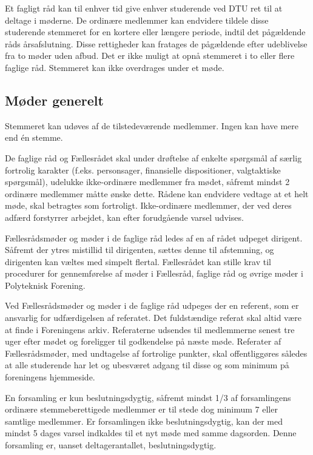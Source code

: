 \begin{list}
\begin{list}
\item  Et fagligt råd kan til enhver tid give enhver studerende ved DTU ret til at deltage i møderne. De ordinære medlemmer kan endvidere tildele disse studerende stemmeret for en kortere eller længere periode, indtil det pågældende råds årsafslutning. Disse rettigheder kan fratages de pågældende efter udeblivelse fra to møder uden afbud. Det er ikke muligt at opnå stemmeret i to eller flere faglige råd. Stemmeret kan ikke overdrages under et møde.


\subsection{Møder generelt}
\label{S:kap:MoederGenerelt}
\item  Stemmeret kan udøves af de tilstedeværende medlemmer. Ingen kan have mere end én stemme.

\item \label{S:MoederGenerelt:fortrolig} De faglige råd og Fællesrådet skal under drøftelse af enkelte spørgsmål af særlig fortrolig karakter (f.eks. personsager, finansielle dispositioner, valgtaktiske spørgsmål), udelukke ikke-ordinære medlemmer fra mødet, såfremt mindst 2 ordinære medlemmer måtte ønske dette. Rådene kan endvidere vedtage at et helt møde, skal betragtes som fortroligt. Ikke-ordinære medlemmer, der ved deres adfærd forstyrrer arbejdet, kan efter forudgående varsel udvises.

\item  Fællesrådsmøder og møder i de faglige råd ledes af en af rådet udpeget dirigent. Såfremt der ytres mistillid til dirigenten, sættes denne til afstemning, og dirigenten kan væltes med simpelt flertal. Fællesrådet kan stille krav til procedurer for gennemførelse af møder i Fællesråd, faglige råd og øvrige møder i Polyteknisk Forening.

\item  Ved Fællesrådsmøder og møder i de faglige råd udpeges der en referent, som er ansvarlig for udfærdigelsen af referatet. Det fuldstændige referat skal altid være at finde i Foreningens arkiv. Referaterne udsendes til medlemmerne senest tre uger efter mødet og foreligger til godkendelse på næste møde. Referater af Fællesrådsmøder, med undtagelse af fortrolige punkter, skal offentliggøres således at alle studerende har let og ubesværet adgang til disse og som minimum på foreningens hjemmeside.

\item  En forsamling er kun beslutningsdygtig, såfremt mindst 1/3 af forsamlingens ordinære stemmeberettigede medlemmer er til stede dog minimum 7 eller samtlige medlemmer. Er forsamlingen ikke beslutningsdygtig, kan der med mindst 5 dages varsel indkaldes til et nyt møde med samme dagsorden. Denne forsamling er, uanset deltagerantallet, beslutningsdygtig.


\end{list}
\end{list}
